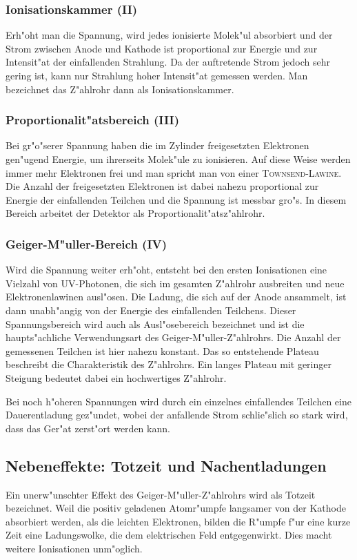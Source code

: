 		\subsubsection{Ionisationskammer (II)}
		\label{subsubsec:ionisationskammer}
			Erh"oht man die Spannung, wird jedes ionisierte Molek"ul absorbiert und der Strom zwischen Anode und Kathode ist proportional zur Energie und zur Intensit"at der einfallenden Strahlung.
			Da der auftretende Strom jedoch sehr gering ist, kann nur Strahlung hoher Intensit"at gemessen werden.
			Man bezeichnet das Z"ahlrohr dann als Ionisationskammer.

		\subsubsection{Proportionalit"atsbereich (III)}
		\label{subsubsec:proportionalitaetsbereich}
			Bei gr"o"serer Spannung haben die im Zylinder freigesetzten Elektronen gen"ugend Energie, um ihrerseits Molek"ule zu ionisieren.
			Auf diese Weise werden immer mehr Elektronen frei und man spricht man von einer \textsc{Townsend-Lawine}.
			Die Anzahl der freigesetzten Elektronen ist dabei nahezu proportional zur Energie der einfallenden Teilchen und die Spannung ist messbar gro"s.
			In diesem Bereich arbeitet der Detektor als Proportionalit"atsz"ahlrohr.

		\subsubsection{Geiger-M"uller-Bereich (IV)}
		\label{subsubsec:geiger-mueller-bereich}
			Wird die Spannung weiter erh"oht, entsteht bei den ersten Ionisationen eine Vielzahl von UV-Photonen, die sich im gesamten Z"ahlrohr ausbreiten und neue Elektronenlawinen ausl"osen.
			Die Ladung, die sich auf der Anode ansammelt, ist dann unabh"angig von der Energie des einfallenden Teilchens.
			Dieser Spannungsbereich wird auch als Ausl"osebereich bezeichnet und ist die haupts"achliche Verwendungsart des Geiger-M"uller-Z"ahlrohrs.
			Die Anzahl der gemessenen Teilchen ist hier nahezu konstant.
			Das so entstehende Plateau beschreibt die Charakteristik des Z"ahlrohrs.
			Ein langes Plateau mit geringer Steigung bedeutet dabei ein hochwertiges Z"ahlrohr.

			Bei noch h"oheren Spannungen wird durch ein einzelnes einfallendes Teilchen eine Dauerentladung gez"undet, wobei der anfallende Strom schlie"slich so stark wird, dass das Ger"at zerst"ort werden kann.

	\subsection{Nebeneffekte: Totzeit und Nachentladungen}
	\label{subsec:nebeneffekte}
		Ein unerw"unschter Effekt des Geiger-M"uller-Z"ahlrohrs wird als Totzeit bezeichnet.
		Weil die positiv geladenen Atomr"umpfe langsamer von der Kathode absorbiert werden, als die leichten Elektronen, bilden die R"umpfe f"ur eine kurze Zeit eine Ladungswolke, die dem elektrischen Feld entgegenwirkt.
		Dies macht weitere Ionisationen unm"oglich.

